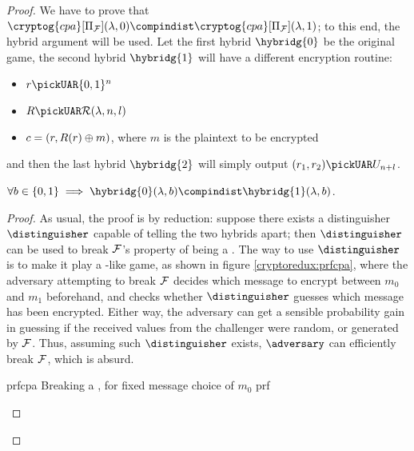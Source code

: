 \begin{proof}
    We have to prove that $\cryptog{cpa}[\Pi_{\F}](\lambda, 0) \compindist \cryptog{cpa}[\Pi_{\F}](\lambda, 1)$; to this end, the hybrid argument will be used. Let the first hybrid $\hybridg{0}$ be the original game, the second hybrid $\hybridg{1}$ will have a different encryption routine:

    \begin{itemize}
        \item $r \pickUAR \{0, 1\}^n$
        \item $R \pickUAR \R(\lambda, n, l)$
        \item $c = (r, R(r) \oplus m)$, where $m$ is the plaintext to be encrypted
    \end{itemize}

    and then the last hybrid $\hybridg{2}$ will simply output $(r_1, r_2) \pickUAR U_{n+l}$.

    \begin{lemma}
        $\forall b \in \{0, 1\} \implies \hybridg{0}(\lambda, b) \compindist \hybridg{1}(\lambda, b)$.
    \end{lemma}

    \begin{proof}
        As usual, the proof is by reduction: suppose there exists a distinguisher $\distinguisher$ capable of telling the two hybrids apart; then $\distinguisher$ can be used to break $\mathcal{F}$'s property of being a \prf. The way to use $\distinguisher$ is to make it play a \cpa-like game, as shown in figure \ref{cryptoredux:prfcpa}\footnotemark, where the adversary attempting to break $\mathcal{F}$ decides which message to encrypt between $m_0$ and $m_1$ beforehand, and checks whether $\distinguisher$ guesses which message has been encrypted. Either way, the adversary can get a sensible probability gain in guessing if the received values from the challenger were random, or generated by $\mathcal{F}$. Thus, assuming such $\distinguisher$ exists, $\adversary$ can efficiently break $\mathcal{F}$, which is absurd.



        \begin{cryptoredux}
            {prfcpa}
            {Breaking a \prf, for fixed message choice of $m_0$}
            {prf}
            {}


\end{cryptoredux}
\end{proof}
\end{proof}
